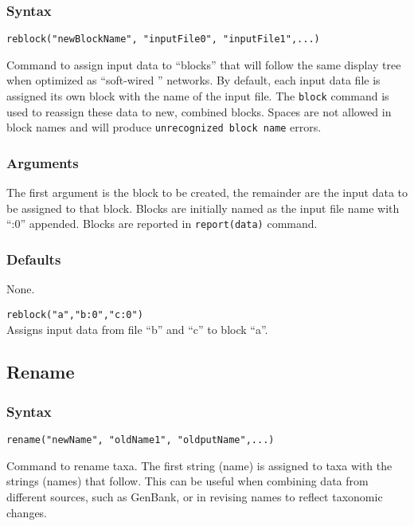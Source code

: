 	\subsubsection{Syntax}
		\texttt{reblock("newBlockName", "inputFile0", "inputFile1",...)}
	
	\begin{phygdescription}
	{Command to assign input data to ``blocks'' that will follow the same display tree when optimized
	as ``soft-wired '' networks. By default, each input data file is assigned its own block with the name
	of the input file. The \texttt{block} command is used to reassign these data to new, combined blocks.
	Spaces are not allowed in block names and will produce \texttt{unrecognized block name} errors.}  
	\end{phygdescription}
	
	\subsubsection{Arguments}
		The first argument is the block to be created, the remainder are the input data to be 
		assigned to that block. Blocks are initially named as the input file name with ``:0'' appended. 
		Blocks are reported in \texttt{report(data)} command.
	
	\subsubsection{Defaults}
		None.
	
	\begin{example}

		\item{\texttt{reblock("a","b:0","c:0")}\\ Assigns input data from file ``b'' and ``c'' to block ``a''. }
	
	\end{example}

\subsection{Rename}
	\subsubsection{Syntax}
		\texttt{rename("newName", "oldName1", "oldputName",...)}
		
	\begin{phygdescription}
	{Command to rename taxa. The first string (name) is assigned to taxa with the strings (names) 
	that follow. This can be useful when combining data from different sources, such as GenBank, 
	or in revising names to reflect taxonomic changes.}
	\end{phygdescription}
	
